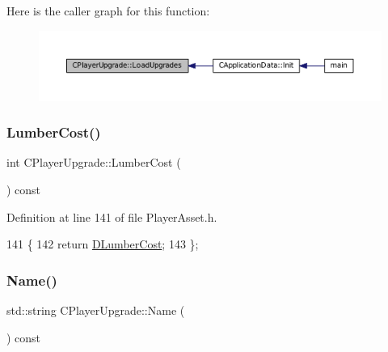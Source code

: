 Here is the caller graph for this function\+:
\nopagebreak
\begin{figure}[H]
\begin{center}
\leavevmode
\includegraphics[width=350pt]{classCPlayerUpgrade_a9bef3d3f2866cd555a9b175426e953d6_icgraph}
\end{center}
\end{figure}
\hypertarget{classCPlayerUpgrade_ac7ecd3365fd8b9b54fb38df815f31877}{}\label{classCPlayerUpgrade_ac7ecd3365fd8b9b54fb38df815f31877} 
\subsubsection{\texorpdfstring{Lumber\+Cost()}{LumberCost()}}
{\footnotesize\ttfamily int C\+Player\+Upgrade\+::\+Lumber\+Cost (\begin{DoxyParamCaption}{ }\end{DoxyParamCaption}) const\hspace{0.3cm}{\ttfamily [inline]}}



Definition at line 141 of file Player\+Asset.\+h.


\begin{DoxyCode}
141                               \{
142             \textcolor{keywordflow}{return} \hyperlink{classCPlayerUpgrade_a3c671aceeaeec746fc5ab3c9de28194b}{DLumberCost};  
143         \};
\end{DoxyCode}
\hypertarget{classCPlayerUpgrade_a9030c62bc29150957f2fb6485ee9c01f}{}\label{classCPlayerUpgrade_a9030c62bc29150957f2fb6485ee9c01f} 
\subsubsection{\texorpdfstring{Name()}{Name()}}
{\footnotesize\ttfamily std\+::string C\+Player\+Upgrade\+::\+Name (\begin{DoxyParamCaption}{ }\end{DoxyParamCaption}) const\hspace{0.3cm}{\ttfamily [inline]}}



